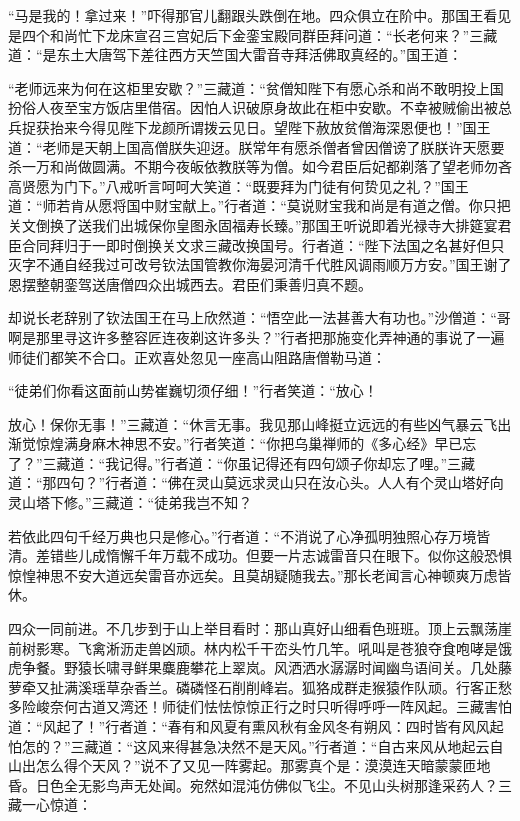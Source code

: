 \documentclass[12pt,UTF8]{ctexbook}
\begin{document}
{	“马是我的！拿过来！”吓得那官儿翻跟头跌倒在地。四众俱立在阶中。那国王看见是四个和尚忙下龙床宣召三宫妃后下金銮宝殿同群臣拜问道：“长老何来？”三藏道：“是东土大唐驾下差往西方天竺国大雷音寺拜活佛取真经的。”国王道：
	
	“老师远来为何在这柜里安歇？”三藏道：“贫僧知陛下有愿心杀和尚不敢明投上国扮俗人夜至宝方饭店里借宿。因怕人识破原身故此在柜中安歇。不幸被贼偷出被总兵捉获抬来今得见陛下龙颜所谓拨云见日。望陛下赦放贫僧海深恩便也！”国王道：“老师是天朝上国高僧朕失迎迓。朕常年有愿杀僧者曾因僧谤了朕朕许天愿要杀一万和尚做圆满。不期今夜皈依教朕等为僧。如今君臣后妃都剃落了望老师勿吝高贤愿为门下。”八戒听言呵呵大笑道：“既要拜为门徒有何贽见之礼？”国王道：“师若肯从愿将国中财宝献上。”行者道：“莫说财宝我和尚是有道之僧。你只把关文倒换了送我们出城保你皇图永固福寿长臻。”那国王听说即着光禄寺大排筵宴君臣合同拜归于一即时倒换关文求三藏改换国号。行者道：“陛下法国之名甚好但只灭字不通自经我过可改号钦法国管教你海晏河清千代胜风调雨顺万方安。”国王谢了恩摆整朝銮驾送唐僧四众出城西去。君臣们秉善归真不题。
	
	却说长老辞别了钦法国王在马上欣然道：“悟空此一法甚善大有功也。”沙僧道：“哥啊是那里寻这许多整容匠连夜剃这许多头？”行者把那施变化弄神通的事说了一遍师徒们都笑不合口。正欢喜处忽见一座高山阻路唐僧勒马道：
	
	“徒弟们你看这面前山势崔巍切须仔细！”行者笑道：“放心！
	
	放心！保你无事！”三藏道：“休言无事。我见那山峰挺立远远的有些凶气暴云飞出渐觉惊煌满身麻木神思不安。”行者笑道：“你把乌巢禅师的《多心经》早已忘了？”三藏道：“我记得。”行者道：“你虽记得还有四句颂子你却忘了哩。”三藏道：“那四句？”行者道：“佛在灵山莫远求灵山只在汝心头。人人有个灵山塔好向灵山塔下修。”三藏道：“徒弟我岂不知？
	
	若依此四句千经万典也只是修心。”行者道：“不消说了心净孤明独照心存万境皆清。差错些儿成惰懈千年万载不成功。但要一片志诚雷音只在眼下。似你这般恐惧惊惶神思不安大道远矣雷音亦远矣。且莫胡疑随我去。”那长老闻言心神顿爽万虑皆休。
	
	四众一同前进。不几步到于山上举目看时：那山真好山细看色班班。顶上云飘荡崖前树影寒。飞禽淅沥走兽凶顽。林内松千干峦头竹几竿。吼叫是苍狼夺食咆哮是饿虎争餐。野猿长啸寻鲜果麋鹿攀花上翠岚。风洒洒水潺潺时闻幽鸟语间关。几处藤萝牵又扯满溪瑶草杂香兰。磷磷怪石削削峰岩。狐狢成群走猴猿作队顽。行客正愁多险峻奈何古道又湾还！师徒们怯怯惊惊正行之时只听得呼呼一阵风起。三藏害怕道：“风起了！”行者道：“春有和风夏有熏风秋有金风冬有朔风：四时皆有风风起怕怎的？”三藏道：“这风来得甚急决然不是天风。”行者道：“自古来风从地起云自山出怎么得个天风？”说不了又见一阵雾起。那雾真个是：漠漠连天暗蒙蒙匝地昏。日色全无影鸟声无处闻。宛然如混沌仿佛似飞尘。不见山头树那逢采药人？三藏一心惊道：
	
}
\end{document}
